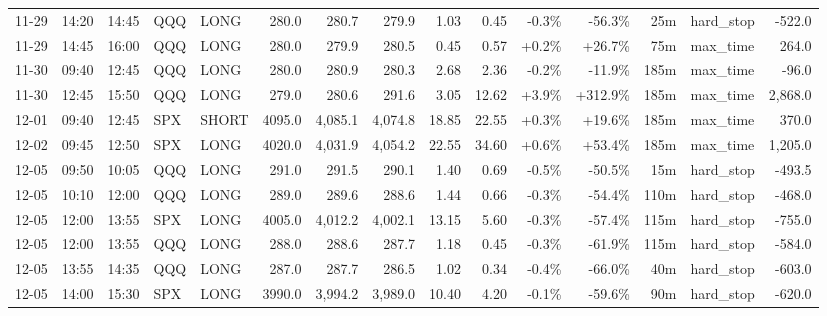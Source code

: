 \documentclass[11pt,a4paper,twoside]{article}
\begin{document}
\begin{landscape}
\begin{center}
\begin{longtable}{>{\color{txtmain}}l l l l l r r r r r r r r >{\color{txtmain}}l r}
11-29 & 14:20 & 14:45 & QQQ & LONG & 280.0 & 280.7 & 279.9 & 1.03 & 0.45 & \textcolor{lossred}{-0.3\%} & \textcolor{lossred}{-56.3\%} & 25m & hard\_stop & \textcolor{lossred}{-522.0} \\
11-29 & 14:45 & 16:00 & QQQ & LONG & 280.0 & 279.9 & 280.5 & 0.45 & 0.57 & \textcolor{wingreen}{+0.2\%} & \textcolor{wingreen}{+26.7\%} & 75m & max\_time & \textcolor{wingreen}{264.0} \\
11-30 & 09:40 & 12:45 & QQQ & LONG & 280.0 & 280.9 & 280.3 & 2.68 & 2.36 & \textcolor{lossred}{-0.2\%} & \textcolor{lossred}{-11.9\%} & 185m & max\_time & \textcolor{lossred}{-96.0} \\
11-30 & 12:45 & 15:50 & QQQ & LONG & 279.0 & 280.6 & 291.6 & 3.05 & 12.62 & \textcolor{wingreen}{+3.9\%} & \textcolor{wingreen}{+312.9\%} & 185m & max\_time & \textcolor{wingreen}{2,868.0} \\
12-01 & 09:40 & 12:45 & SPX & SHORT & 4095.0 & 4,085.1 & 4,074.8 & 18.85 & 22.55 & \textcolor{wingreen}{+0.3\%} & \textcolor{wingreen}{+19.6\%} & 185m & max\_time & \textcolor{wingreen}{370.0} \\
12-02 & 09:45 & 12:50 & SPX & LONG & 4020.0 & 4,031.9 & 4,054.2 & 22.55 & 34.60 & \textcolor{wingreen}{+0.6\%} & \textcolor{wingreen}{+53.4\%} & 185m & max\_time & \textcolor{wingreen}{1,205.0} \\
12-05 & 09:50 & 10:05 & QQQ & LONG & 291.0 & 291.5 & 290.1 & 1.40 & 0.69 & \textcolor{lossred}{-0.5\%} & \textcolor{lossred}{-50.5\%} & 15m & hard\_stop & \textcolor{lossred}{-493.5} \\
12-05 & 10:10 & 12:00 & QQQ & LONG & 289.0 & 289.6 & 288.6 & 1.44 & 0.66 & \textcolor{lossred}{-0.3\%} & \textcolor{lossred}{-54.4\%} & 110m & hard\_stop & \textcolor{lossred}{-468.0} \\
12-05 & 12:00 & 13:55 & SPX & LONG & 4005.0 & 4,012.2 & 4,002.1 & 13.15 & 5.60 & \textcolor{lossred}{-0.3\%} & \textcolor{lossred}{-57.4\%} & 115m & hard\_stop & \textcolor{lossred}{-755.0} \\
12-05 & 12:00 & 13:55 & QQQ & LONG & 288.0 & 288.6 & 287.7 & 1.18 & 0.45 & \textcolor{lossred}{-0.3\%} & \textcolor{lossred}{-61.9\%} & 115m & hard\_stop & \textcolor{lossred}{-584.0} \\
12-05 & 13:55 & 14:35 & QQQ & LONG & 287.0 & 287.7 & 286.5 & 1.02 & 0.34 & \textcolor{lossred}{-0.4\%} & \textcolor{lossred}{-66.0\%} & 40m & hard\_stop & \textcolor{lossred}{-603.0} \\
12-05 & 14:00 & 15:30 & SPX & LONG & 3990.0 & 3,994.2 & 3,989.0 & 10.40 & 4.20 & \textcolor{lossred}{-0.1\%} & \textcolor{lossred}{-59.6\%} & 90m & hard\_stop & \textcolor{lossred}{-620.0} \\

\end{longtable}
\end{center}
\end{landscape}
\end{document}
